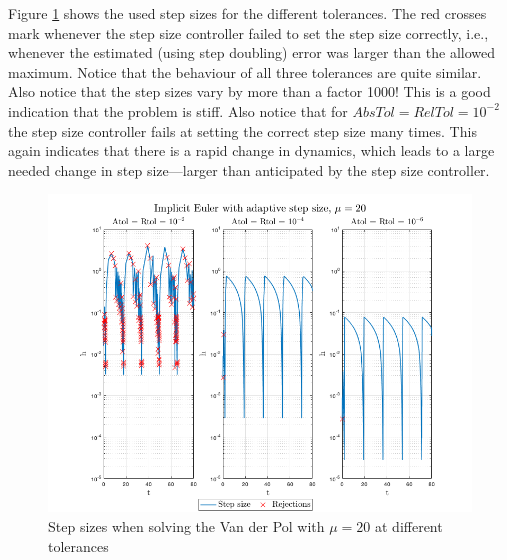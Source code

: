 Figure \ref{fig3:adap_mu20_h} shows the used step sizes for the different tolerances. The red crosses mark whenever the step size controller failed to set the step size correctly, i.e., whenever the estimated (using step doubling) error was larger than the allowed maximum. Notice that the behaviour of all three tolerances are quite similar. Also notice that the step sizes vary by more than a factor 1000! This is a good indication that the problem is stiff. Also notice that for $AbsTol=RelTol=10^{-2}$ the step size controller fails at setting the correct step size many times. This again indicates that there is a rapid change in dynamics, which leads to a large needed change in step size---larger than anticipated by the step size controller.

\begin{figure}[H]
    \centering
    \includegraphics[width=\textwidth]{graphics/opg3/mu20_h.png}
    \caption{Step sizes when solving the Van der Pol with $\mu = 20$ at different tolerances}
    \label{fig3:adap_mu20_h}
\end{figure}






